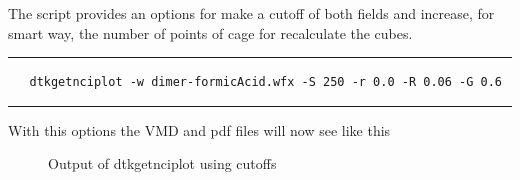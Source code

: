 The script provides an options for make a cutoff of both fields and increase, for smart way, the number of points of cage for recalculate the cubes.

\rule{\textwidth}{1pt}
\begin{footnotesize}
\begin{verbatim}
   dtkgetnciplot -w dimer-formicAcid.wfx -S 250 -r 0.0 -R 0.06 -G 0.6
\end{verbatim}
\end{footnotesize}
\rule{\textwidth}{1pt}

With this options the VMD and pdf files will now see like this
%
\begin{figure}[hb!]
\centering
{}\quad
{}
\caption{Output of dtkgetnciplot using cutoffs}\label{fig:dtkgetnciplotCutoff}
\end{figure}
%



